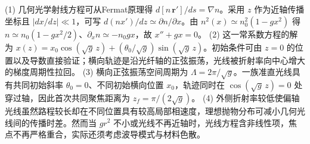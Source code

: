 (1) 几何光学射线方程可从Fermat原理得 \(d[n\,\mathbf r']/ds=\nabla n\)。采用 \(z\) 作为近轴传播坐标且 \(|dx/dz|\ll1\)，可写 \(d(n x')/dz\simeq\partial n/\partial x\)。由 \(n^2(x)\simeq n_0^2(1-gx^2)\) 得 \(n\simeq n_0(1-gx^2/2)\)、\(\partial_x n\simeq-n_0gx\)，故 \(x''+gx=0\)。
(2) 这一常系数方程的解为 \(x(z)=x_0\cos(\sqrt g\,z)+(\theta_0/\sqrt g)\sin(\sqrt g\,z)\)。初始条件可由 \(z=0\) 的位置以及导数直接验证；横向轨迹是沿光纤轴的正弦振荡，光线被折射率向中心增大的梯度周期性拉回。
(3) 横向正弦振荡空间周期为 \(\Lambda=2\pi/\sqrt g\)。一族准直光线具有共同初始斜率 \(\theta_0=0\)、不同初始横向位置 \(x_0\)，轨迹同时在 \(\cos(\sqrt g\,z)=0\) 处穿过轴，因此首次共同聚焦距离为 \(z_f=\pi/(2\sqrt g)\)。
(4) 外侧折射率较低使偏轴光线虽然路程较长却在不同位置具有较高局部相速度，理想抛物分布可减小几何光线间的传播时差。然而当 \(gr^2\) 不小或光线不再近轴时，光线方程含非线性项，焦点不再严格重合，实际还须考虑波导模式与材料色散。
